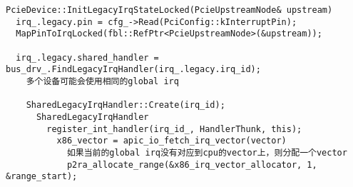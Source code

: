 \begin{verbatim}
PcieDevice::InitLegacyIrqStateLocked(PcieUpstreamNode& upstream)
  irq_.legacy.pin = cfg_->Read(PciConfig::kInterruptPin);
  MapPinToIrqLocked(fbl::RefPtr<PcieUpstreamNode>(&upstream));

  irq_.legacy.shared_handler = bus_drv_.FindLegacyIrqHandler(irq_.legacy.irq_id);
    多个设备可能会使用相同的global irq

    SharedLegacyIrqHandler::Create(irq_id);
      SharedLegacyIrqHandler
        register_int_handler(irq_id_, HandlerThunk, this);
          x86_vector = apic_io_fetch_irq_vector(vector)
            如果当前的global irq没有对应到cpu的vector上，则分配一个vector
            p2ra_allocate_range(&x86_irq_vector_allocator, 1, &range_start);

            
\end{verbatim}